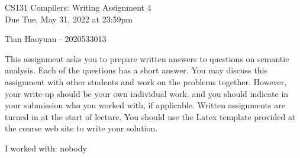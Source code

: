 \documentclass[10pt]{article}
\begin{document}
\begin{center}
  \Large CS131 Compilers: Writing Assignment 4\\
  Due Tue, May 31, 2022 at 23:59pm
\end{center}

\begin{center}
  \LARGE Tian Haoyuan - 2020533013
\end{center}

This assignment asks you to prepare written answers to questions on
semantic analysis. Each of the questions has a short answer. You
may discuss this assignment with other students and work on the problems
together. However, your write-up should be your own individual work.
and you should indicate in your submission who you worked with, if applicable.
Written assignments are turned in at the start of lecture.
You should use the Latex template provided at the course web site to write your solution.

\begin{center}
  I worked with: nobody
\end{center}
\end{document}
